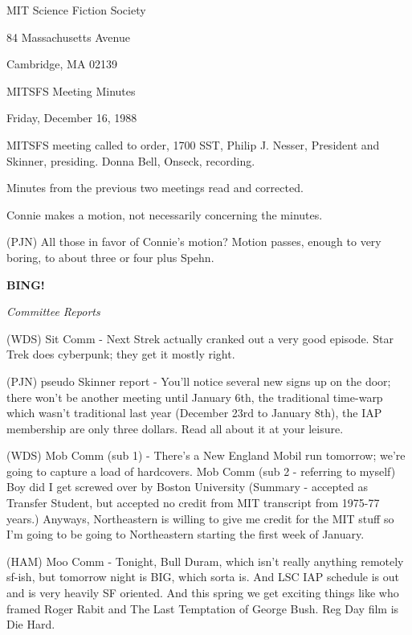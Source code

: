 \documentclass[12pt]{article}
\newcommand{\bing}{{\bf BING!} }
\newcommand{\goto}[1]{\bing \vskip 12pt \centerline{{\em{#1}}}}
\begin{document}
\begin{center}

MIT Science Fiction Society 

84 Massachusetts Avenue

Cambridge, MA 02139

\vspace{12pt}

MITSFS Meeting Minutes 

Friday, December 16, 1988

\end{center}
 
\vspace{18pt}

\setlength{\parskip}{6pt}

\noindent
MITSFS meeting called to order, 1700 SST, Philip J. Nesser, President and Skinner, presiding. Donna Bell, Onseck, recording.

Minutes from the previous two meetings read and corrected.

Connie makes a motion, not necessarily concerning the minutes.

(PJN) All those in favor of Connie's motion?  Motion passes, enough to very boring, to about three or four plus Spehn.

\goto{Committee Reports}

(WDS) Sit Comm - Next Strek actually cranked out a very good episode. Star Trek does cyberpunk; they get it mostly right.

(PJN) pseudo Skinner report - You'll notice several new signs up on the door; there won't be another meeting until January 6th, the traditional time-warp which wasn't traditional last year (December 23rd to January 8th), the IAP membership are only three dollars. Read all about it at your leisure.

(WDS) Mob Comm (sub 1) - There's a New England Mobil run tomorrow; we're going to capture a load of hardcovers. Mob Comm (sub 2 - referring to myself) Boy did I get screwed over by Boston University (Summary - accepted as Transfer Student, but accepted no credit from MIT transcript from 1975-77 years.) Anyways, Northeastern is willing to give me credit for the MIT stuff so I'm going to be going to Northeastern starting the first week of January.

(HAM) Moo Comm - Tonight, Bull Duram, which isn't really anything remotely sf-ish, but tomorrow night is BIG, which sorta is. And LSC IAP schedule is out and is very heavily SF oriented. And this spring
we get exciting things like who framed Roger Rabit and The Last Temptation of George Bush. Reg Day film is Die Hard.
\end{document}
